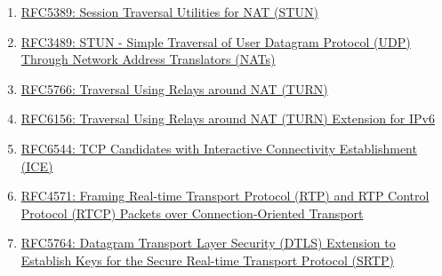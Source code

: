 \documentclass[9pt]{extarticle}
\begin{document}
\begin{multicols}{2}
\begin{enumerate}
\begin{enumerate}
    \item \href{https://tools.ietf.org/html/rfc5389}{RFC5389: Session Traversal Utilities for NAT (STUN)}
    \item \href{https://tools.ietf.org/html/rfc3489}{RFC3489: STUN - Simple Traversal of User Datagram Protocol (UDP) Through Network Address Translators (NATs)}
    \item \href{https://tools.ietf.org/html/rfc5766}{RFC5766: Traversal Using Relays around NAT (TURN)}
    \item \href{https://tools.ietf.org/html/rfc6156}{RFC6156: Traversal Using Relays around NAT (TURN) Extension for IPv6}
    \item \href{https://tools.ietf.org/html/rfc6544}{RFC6544: TCP Candidates with Interactive Connectivity  Establishment (ICE)}
    \item \href{https://tools.ietf.org/html/RFC4571}{RFC4571: Framing Real-time Transport Protocol (RTP) and RTP Control Protocol (RTCP) Packets over Connection-Oriented Transport}
    \item \href{https://tools.ietf.org/html/rfc5764}{RFC5764: Datagram Transport Layer Security (DTLS) Extension to Establish Keys for the Secure Real-time Transport Protocol (SRTP)}
    \end{enumerate}


\end{enumerate}
\end{multicols}
\end{document}
